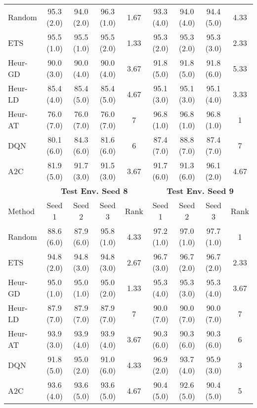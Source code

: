 \begin{table}[t]
{\begin{tabular}{lcccccccc}
Random     & 95.3 (2.0)  & 94.0 (2.0)  & 96.3 (1.0) & 1.67 & 93.3 (4.0)  & 94.0 (4.0)  & 94.4 (5.0) & 4.33 \\
ETS        & 95.5 (1.0)  & 95.5 (1.0)  & 95.5 (2.0) & 1.33 & 95.3 (2.0)  & 95.3 (2.0)  & 95.3 (3.0) & 2.33 \\
Heur-GD & 90.0 (3.0)  & 90.0 (4.0)  & 90.0 (4.0) & 3.67 & 91.8 (5.0)  & 91.8 (5.0)  & 91.8 (6.0) & 5.33 \\
Heur-LD & 85.4 (4.0)  & 85.4 (5.0)  & 85.4 (5.0) & 4.67 & 95.1 (3.0)  & 95.1 (3.0)  & 95.1 (4.0) & 3.33 \\
Heur-AT & 76.0 (7.0)  & 76.0 (7.0)  & 76.0 (7.0) & 7    & 96.8 (1.0)  & 96.8 (1.0)  & 96.8 (1.0) & 1    \\
DQN        & 80.1 (6.0)  & 84.3 (6.0)  & 81.6 (6.0) & 6    & 87.4 (7.0)  & 88.8 (7.0)  & 87.4 (7.0) & 7    \\
A2C        & 81.9 (5.0)  & 91.7 (3.0)  & 91.5 (3.0) & 3.67 & 91.7 (6.0)  & 91.3 (6.0)  & 96.1 (2.0) & 4.67 \\ \midrule
\textbf{}  & \multicolumn{4}{c}{\textbf{Test Env. Seed 8}} & \multicolumn{4}{c}{\textbf{Test Env. Seed 9}} \\
    \cmidrule(lr){2-5} \cmidrule(lr){6-9} 
Method     & Seed 1      & Seed 2      & Seed 3     & Rank & Seed 1      & Seed 2      & Seed 3     & Rank \\ \midrule
Random     & 88.6 (6.0)  & 87.9 (6.0)  & 95.8 (1.0) & 4.33 & 97.2 (1.0)  & 97.0 (1.0)  & 97.7 (1.0) & 1    \\
ETS        & 94.8 (2.0)  & 94.8 (3.0)  & 94.8 (3.0) & 2.67 & 96.7 (3.0)  & 96.7 (2.0)  & 96.7 (2.0) & 2.33 \\
Heur-GD & 95.0 (1.0)  & 95.0 (1.0)  & 95.0 (2.0) & 1.33 & 95.3 (4.0)  & 95.3 (3.0)  & 95.3 (4.0) & 3.67 \\
Heur-LD & 87.9 (7.0)  & 87.9 (7.0)  & 87.9 (7.0) & 7    & 90.0 (7.0)  & 90.0 (7.0)  & 90.0 (7.0) & 7    \\
Heur-AT & 93.9 (3.0)  & 93.9 (4.0)  & 93.9 (4.0) & 3.67 & 90.3 (6.0)  & 90.3 (6.0)  & 90.3 (6.0) & 6    \\
DQN        & 91.8 (5.0)  & 95.0 (2.0)  & 91.0 (6.0) & 4.33 & 96.9 (2.0)  & 93.7 (4.0)  & 95.9 (3.0) & 3    \\
A2C        & 93.6 (4.0)  & 93.6 (5.0)  & 93.6 (5.0) & 4.67 & 90.4 (5.0)  & 92.6 (5.0)  & 90.4 (5.0) & 5 \\
\bottomrule
\end{tabular}
}
\end{table}